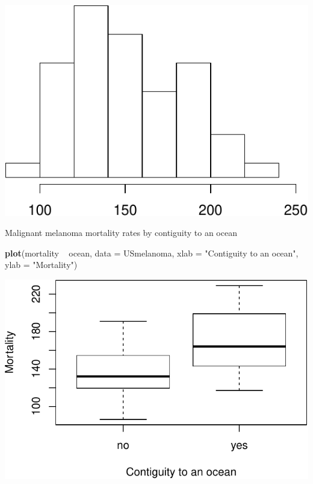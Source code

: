 \documentclass[]{article}
\newenvironment{Shaded}{\begin{snugshade}}{\end{snugshade}}
\newcommand{\KeywordTok}[1]{\textcolor[rgb]{0.13,0.29,0.53}{\textbf{{#1}}}}
\newcommand{\DataTypeTok}[1]{\textcolor[rgb]{0.13,0.29,0.53}{{#1}}}
\newcommand{\StringTok}[1]{\textcolor[rgb]{0.31,0.60,0.02}{{#1}}}
\newcommand{\NormalTok}[1]{{#1}}
\numberwithin{equation}{section}
\begin{document}
\begin{center}\includegraphics{index_files/figure-latex/unnamed-chunk-260-2} \end{center}

Malignant melanoma mortality rates by contiguity to an ocean

\begin{Shaded}
\begin{Highlighting}[]
\KeywordTok{plot}\NormalTok{(mortality ~}\StringTok{ }\NormalTok{ocean, }\DataTypeTok{data =} \NormalTok{USmelanoma, }\DataTypeTok{xlab =} \StringTok{"Contiguity to an ocean"}\NormalTok{, }\DataTypeTok{ylab =} \StringTok{"Mortality"}\NormalTok{)}
\end{Highlighting}
\end{Shaded}

\begin{center}\includegraphics{index_files/figure-latex/unnamed-chunk-261-1} \end{center}
\end{document}
